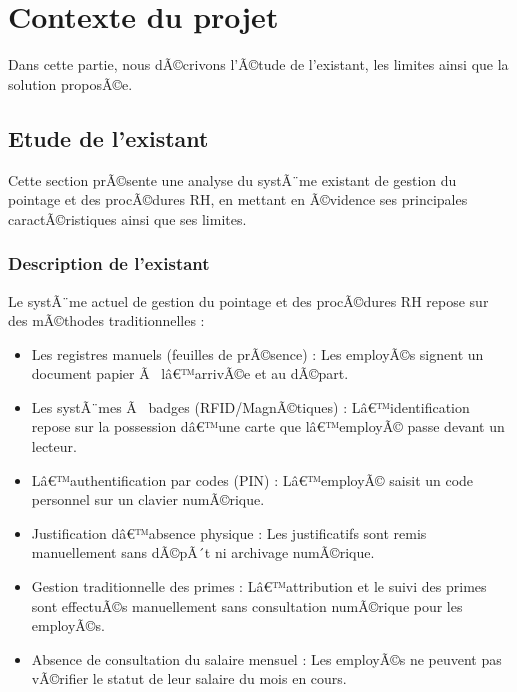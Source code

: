 \section{Contexte du projet}
Dans cette partie, nous dÃ©crivons l'Ã©tude de l'existant, les limites ainsi que la solution proposÃ©e.
\subsection{Etude de l'existant}
Cette section prÃ©sente une analyse du systÃ¨me existant de gestion du pointage et des procÃ©dures RH, en mettant en Ã©vidence ses principales caractÃ©ristiques ainsi que ses limites. 
\subsubsection{Description de l'existant}
Le systÃ¨me actuel de gestion du pointage et des procÃ©dures RH repose sur des mÃ©thodes traditionnelles :
\begin{itemize}
\item Les registres manuels (feuilles de prÃ©sence) : Les employÃ©s signent un document papier Ã  lâ€™arrivÃ©e et au dÃ©part.

\item  Les systÃ¨mes Ã  badges (RFID/MagnÃ©tiques) : Lâ€™identification repose sur la possession dâ€™une carte que lâ€™employÃ© passe devant un lecteur.

\item Lâ€™authentification par codes (PIN) : Lâ€™employÃ© saisit un code personnel sur un clavier numÃ©rique.
\item Justification dâ€™absence physique : Les justificatifs sont remis manuellement sans dÃ©pÃ´t ni archivage numÃ©rique.
\item Gestion traditionnelle des primes : Lâ€™attribution et le suivi des primes sont effectuÃ©s manuellement sans consultation numÃ©rique pour les employÃ©s.
\item Absence de consultation du salaire mensuel : Les employÃ©s ne peuvent pas vÃ©rifier le statut de leur salaire du mois en cours.

\end{itemize}



